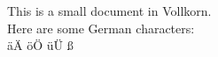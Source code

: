 \documentclass{article}
\begin{document}
This is a small document in Vollkorn.
\\
Here are some German characters:
\\
äÄ öÖ üÜ ß
\end{document}
